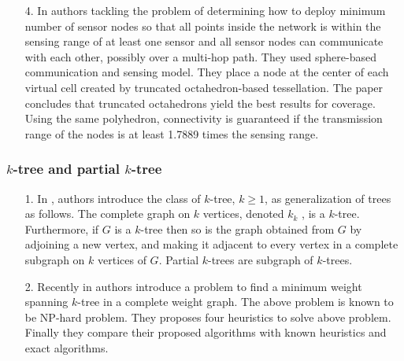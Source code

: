 \documentclass[12pt]{article}
\begin{document}
\begin{itemize}
\item[4.] In \cite{Nazrul2008} authors tackling the problem of determining how to deploy minimum number of sensor nodes so that all points inside the network is within the sensing range of at least one sensor and all sensor nodes can communicate with each other, possibly over a multi-hop path. They used sphere-based communication
and sensing model. They place a node at the center of each virtual cell created by truncated octahedron-based tessellation.  The paper concludes that truncated octahedrons yield the best results for coverage. Using the same polyhedron, connectivity is guaranteed if the transmission range of the nodes is at least 1.7889 times the sensing range.
 \end{itemize}
 \subsubsection{$k$-tree and partial $k$-tree}
\begin{itemize}

 \item[1.] In \cite{Beineke1971}, authors introduce the class of $k$-tree, $k\geq1$, as generalization of trees as follows. The complete graph on $k$ vertices, denoted $k_ k$ , is a $k$-tree. Furthermore, if $G$ is a $k$-tree then so is the graph obtained from $G$ by adjoining a new vertex, and making it adjacent to every vertex in a complete subgraph on $k$ vertices of $G$. Partial $k$-trees are subgraph of $k$-trees. 
 \item[2.] Recently in \cite{shangin2014heuristics} authors introduce a problem to find a minimum weight spanning $k$-tree in a complete weight graph. The above problem is known to be NP-hard problem. They proposes four heuristics to solve above problem. Finally they compare their proposed algorithms with known heuristics and exact algorithms.
\end{itemize}
\end{document}
